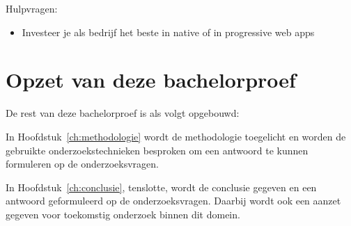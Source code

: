 Hulpvragen:
\begin{itemize}  
	\item Investeer je als bedrijf het beste in native of in progressive web apps
\end{itemize}



\section{Opzet van deze bachelorproef}
\label{sec:opzet-bachelorproef}


De rest van deze bachelorproef is als volgt opgebouwd:

In Hoofdstuk~\ref{ch:methodologie} wordt de methodologie toegelicht en worden de gebruikte onderzoekstechnieken besproken om een antwoord te kunnen formuleren op de onderzoeksvragen.


In Hoofdstuk~\ref{ch:conclusie}, tenslotte, wordt de conclusie gegeven en een antwoord geformuleerd op de onderzoeksvragen. Daarbij wordt ook een aanzet gegeven voor toekomstig onderzoek binnen dit domein.

